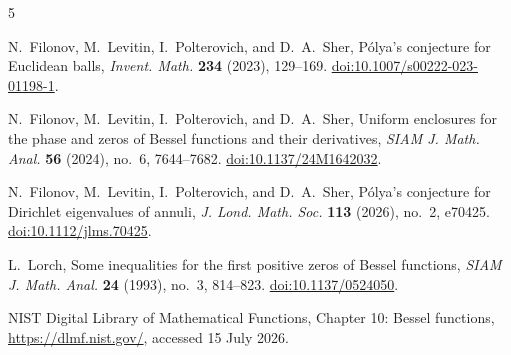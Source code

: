 \documentclass[11pt]{article}
\numberwithin{equation}{section}
\theoremstyle{definition}
\theoremstyle{remark}
\begin{document}
\begin{thebibliography}{5}

N.~Filonov, M.~Levitin, I.~Polterovich, and D.~A.~Sher,
\newblock P\'olya's conjecture for Euclidean balls,
\newblock \emph{Invent. Math.} \textbf{234} (2023), 129--169.
\newblock \href{https://doi.org/10.1007/s00222-023-01198-1}{doi:10.1007/s00222-023-01198-1}.

N.~Filonov, M.~Levitin, I.~Polterovich, and D.~A.~Sher,
\newblock Uniform enclosures for the phase and zeros of Bessel functions and
their derivatives,
\newblock \emph{SIAM J. Math. Anal.} \textbf{56} (2024), no.~6, 7644--7682.
\newblock \href{https://doi.org/10.1137/24M1642032}{doi:10.1137/24M1642032}.

N.~Filonov, M.~Levitin, I.~Polterovich, and D.~A.~Sher,
\newblock P\'olya's conjecture for Dirichlet eigenvalues of annuli,
\newblock \emph{J. Lond. Math. Soc.} \textbf{113} (2026), no.~2, e70425.
\newblock \href{https://doi.org/10.1112/jlms.70425}{doi:10.1112/jlms.70425}.

L.~Lorch,
\newblock Some inequalities for the first positive zeros of Bessel
functions,
\newblock \emph{SIAM J. Math. Anal.} \textbf{24} (1993), no.~3, 814--823.
\newblock \href{https://doi.org/10.1137/0524050}{doi:10.1137/0524050}.

NIST Digital Library of Mathematical Functions,
\newblock Chapter 10: Bessel functions,
\newblock \url{https://dlmf.nist.gov/}, accessed 15 July 2026.

\end{thebibliography}
\end{document}
